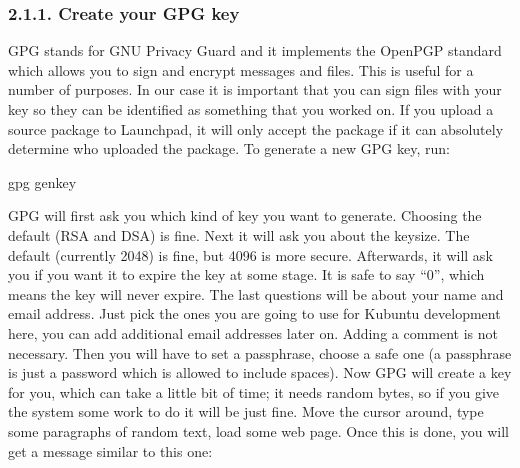 \documentclass[letterpaper,10pt,english]{sphinxmanual}
\begin{document}
\subsubsection{2.1.1. Create your GPG key}
\label{\detokenize{docs/packaging-guide/getting-started:create-your-gpg-key}}
\sphinxAtStartPar
GPG stands for GNU Privacy Guard and it implements the OpenPGP standard which allows you to sign and encrypt messages and files. This is useful for a number of purposes. In our case it is important that you can sign files with your key so they can be identified as something that you worked on. If you upload a source package to Launchpad, it will only accept the package if it can absolutely determine who uploaded the package.
To generate a new GPG key, run:

\begin{sphinxVerbatim}[commandchars=\\\{\}]
\PYGZdl{} gpg \PYGZhy{}\PYGZhy{}gen\PYGZhy{}key
\end{sphinxVerbatim}

\sphinxAtStartPar
GPG will first ask you which kind of key you want to generate. Choosing the default (RSA and DSA) is fine. Next it will ask you about the keysize. The default (currently 2048) is fine, but 4096 is more secure. Afterwards, it will ask you if you want it to expire the key at some stage. It is safe to say “0”, which means the key will never expire. The last questions will be about your name and email address. Just pick the ones you are going to use for Kubuntu development here, you can add additional email addresses later on. Adding a comment is not necessary. Then you will have to set a passphrase, choose a safe one (a passphrase is just a password which is allowed to include spaces).
Now GPG will create a key for you, which can take a little bit of time; it needs random bytes, so if you give the system some work to do it will be just fine. Move the cursor around, type some paragraphs of random text, load some web page.
Once this is done, you will get a message similar to this one:

\begin{sphinxVerbatim}[commandchars=\\\{\}]
    
                   
     
    
\end{sphinxVerbatim}
\end{document}
